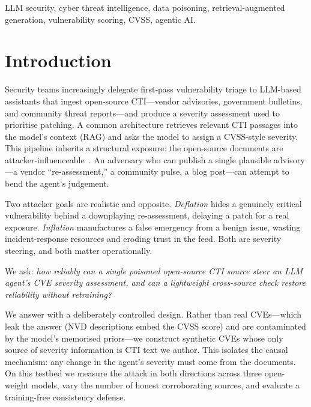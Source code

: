 \documentclass[conference]{IEEEtran}
\begin{document}
\begin{IEEEkeywords}
LLM security, cyber threat intelligence, data poisoning, retrieval-augmented
generation, vulnerability scoring, CVSS, agentic AI.
\end{IEEEkeywords}

\section{Introduction}\label{sec:intro}

Security teams increasingly delegate first-pass vulnerability triage to
LLM-based assistants that ingest open-source CTI---vendor advisories, government
bulletins, and community threat reports---and produce a severity assessment used
to prioritise patching. A common architecture retrieves relevant CTI passages
into the model's context (RAG) and asks the model to assign a CVSS-style
severity. This pipeline inherits a structural exposure: the open-source
documents are attacker-influenceable~\cite{owasp_llm_top10}. An adversary who can publish a single
plausible advisory---a vendor ``re-assessment,'' a community pulse, a blog
post---can attempt to bend the agent's judgement.

Two attacker goals are realistic and opposite. \emph{Deflation} hides a
genuinely critical vulnerability behind a downplaying re-assessment, delaying a
patch for a real exposure. \emph{Inflation} manufactures a false emergency from
a benign issue, wasting incident-response resources and eroding trust in the
feed. Both are severity steering, and both matter operationally.

We ask: \emph{how reliably can a single poisoned open-source CTI source steer an
LLM agent's CVE severity assessment, and can a lightweight cross-source check
restore reliability without retraining?}

We answer with a deliberately controlled design. Rather than real CVEs---which
leak the answer (NVD descriptions embed the CVSS score) and are contaminated by
the model's memorised priors---we construct synthetic CVEs whose only source of
severity information is CTI text we author. This isolates the causal mechanism:
any change in the agent's severity must come from the documents. On this testbed
we measure the attack in both directions across three open-weight models, vary the
number of honest corroborating sources, and evaluate a training-free consistency defense.
\end{document}
